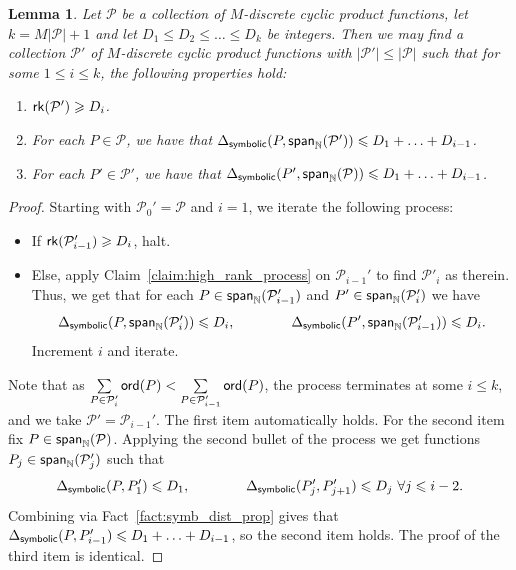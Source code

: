 \documentclass[11pt]{article}
\newtheorem{lemma}[thm]{Lemma}
\newcommand\card[1]{\left| {#1} \right|}
\newcommand\spn{{\sf span}_{\mathbb{N}}}
\renewcommand\geq{\geqslant}
\renewcommand\leq{\leqslant}
\begin{document}
    \begin{lemma}\label{lem:rank_gain}
        Let $\mathcal{P}$ be a collection of $M$-discrete cyclic product functions, let $k = M \card{\mathcal{P}}+1$ and let $D_1\leq D_2\leq\ldots\leq D_k$ be integers. Then we may find a collection $\mathcal{P}'$ of $M$-discrete cyclic product functions with $|\mathcal{P}'|\leq \card{\mathcal{P}}$ such that for some $1\leq i\leq k$, the  following properties hold:
        \begin{enumerate}
            \item ${\sf rk}(\mathcal{P}')\geq D_i$.
            \item For each $P\in\mathcal{P}$, we have that 
            $\Delta_{{\sf symbolic}}(P,\spn(\mathcal{P}'))\leq D_1+\ldots+D_{i-1}$.
            \item For each $P'\in\mathcal{P}'$, we have that 
            $\Delta_{{\sf symbolic}}(P',\spn(\mathcal{P}))\leq D_1+\ldots+D_{i-1}$.
        \end{enumerate}
    \end{lemma}
    \begin{proof}
        Starting with $\mathcal{P}_0'=\mathcal{P}$ and $i=1$, we iterate the following process:
        \begin{itemize}
            \item If ${\sf rk}(\mathcal{P}'_{i-1})\geq D_i$, halt.
            \item Else, apply Claim~\ref{claim:high_rank_process} on $\mathcal{P}_{i-1}'$ to find $\mathcal{P}'_i$ as therein. Thus, we get that for each $P\in \spn(\mathcal{P}_{i-1}')$ and $P'\in \spn(\mathcal{P}_{i}')$ we have \[
            \Delta_{{\sf symbolic}}(P,\spn(\mathcal{P}_i'))\leq D_i,
            \qquad\qquad
            \Delta_{{\sf symbolic}}(P',\spn(\mathcal{P}_{i-1}'))\leq D_i.
            \]
            Increment $i$ and iterate.
        \end{itemize}
        Note that as $\sum\limits_{P\in\mathcal{P}_i'}{\sf ord}(P)
        <\sum\limits_{P\in\mathcal{P}_{i-1}'}{\sf ord}(P)$, the process terminates at some $i\leq k$, and we take $\mathcal{P}' = \mathcal{P}_{i-1}'$. The first item automatically holds. For the second item fix $P\in\spn(\mathcal{P})$. Applying the second bullet of the process we get functions $P_j\in \spn(\mathcal{P}_{j}')$ such that 
        \[
        \Delta_{\sf symbolic}(P, P_1')\leq D_1,
        \qquad\qquad
        \Delta_{\sf symbolic}(P_{j}', P_{j+1}')\leq D_j~\forall j\leq i-2.
        \]
        Combining via Fact~\ref{fact:symb_dist_prop} gives that $\Delta_{\sf symbolic}(P,P_{i-1}')\leq D_1+\ldots+D_{i-1}$, so the second item holds. The proof of the third item is identical.
    \end{proof}
\end{document}
